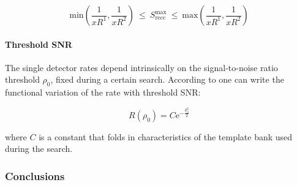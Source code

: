 \documentclass[epsf]{article}
\begin{document}
\begin{equation}
\mathrm{min}(\frac {1}{xR^1}, \frac {1}{xR^2})~ \leq ~S^{\mathrm{max}}_{\mathrm{recc}}~ \leq ~\mathrm{max}(\frac {1}{xR^1}, \frac {1}{xR^2})
\label{timeslidesinterval}
\end{equation}

\paragraph{Threshold SNR} The single detector rates depend intrinsically on the signal-to-noise ratio threshold $\rho_0$, fixed during a certain search. According to \cite{} one can write the functional variation of the rate with threshold SNR:

\begin{equation}
R(\rho_0) = C\mathrm{e}^{-\frac{\rho_0^2}{2}}
\end{equation}

where $C$ is a constant that folds in characteristics of the template bank used during the search.

\subsubsection{Conclusions}
\end{document}
